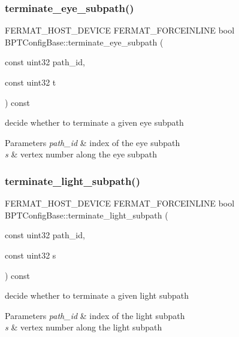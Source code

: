 \subsubsection{\texorpdfstring{terminate\+\_\+eye\+\_\+subpath()}{terminate\_eye\_subpath()}}
{\footnotesize\ttfamily F\+E\+R\+M\+A\+T\+\_\+\+H\+O\+S\+T\+\_\+\+D\+E\+V\+I\+CE F\+E\+R\+M\+A\+T\+\_\+\+F\+O\+R\+C\+E\+I\+N\+L\+I\+NE bool B\+P\+T\+Config\+Base\+::terminate\+\_\+eye\+\_\+subpath (\begin{DoxyParamCaption}\item[{const uint32}]{path\+\_\+id,  }\item[{const uint32}]{t }\end{DoxyParamCaption}) const\hspace{0.3cm}{\ttfamily [inline]}}

decide whether to terminate a given eye subpath


\begin{DoxyParams}{Parameters}
{\em path\+\_\+id} & index of the eye subpath \\
\hline
{\em s} & vertex number along the eye subpath \\
\hline
\end{DoxyParams}
\mbox{\label{struct_b_p_t_config_base_a97c865fc0c241b22bece418e7a8574b4}} 
\subsubsection{\texorpdfstring{terminate\+\_\+light\+\_\+subpath()}{terminate\_light\_subpath()}}
{\footnotesize\ttfamily F\+E\+R\+M\+A\+T\+\_\+\+H\+O\+S\+T\+\_\+\+D\+E\+V\+I\+CE F\+E\+R\+M\+A\+T\+\_\+\+F\+O\+R\+C\+E\+I\+N\+L\+I\+NE bool B\+P\+T\+Config\+Base\+::terminate\+\_\+light\+\_\+subpath (\begin{DoxyParamCaption}\item[{const uint32}]{path\+\_\+id,  }\item[{const uint32}]{s }\end{DoxyParamCaption}) const\hspace{0.3cm}{\ttfamily [inline]}}

decide whether to terminate a given light subpath


\begin{DoxyParams}{Parameters}
{\em path\+\_\+id} & index of the light subpath \\
\hline
{\em s} & vertex number along the light subpath \\
\hline
\end{DoxyParams}
\mbox{\label{struct_b_p_t_config_base_ac1ecb6f3ef04718305291fedf76cec85}} 

